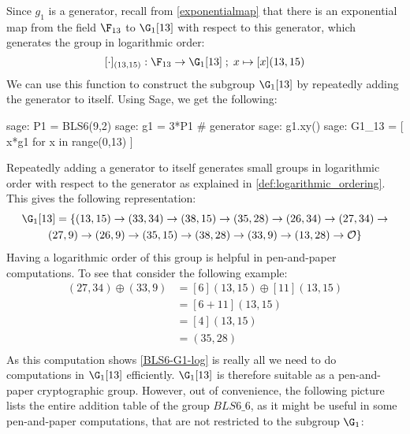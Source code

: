 Since $g_{1}$ is a generator, recall from \ref{exponentialmap} that there is an exponential map from the field $\F_{13}$ to $\G_1[13]$ with respect to this generator, which generates the group in logarithmic order:
$$
[\cdot]_{(13,15)}: \F_{13} \to \G_1[13]\;;\; x \mapsto [x](13,15)
$$ 
We can use this function to construct the subgroup $\G_1[13]$ by repeatedly adding the generator to itself. Using Sage, we get the following:
\begin{sagecommandline}
sage: P1 = BLS6(9,2)
sage: g1 = 3*P1 # generator
sage: g1.xy()
sage: G1_13 = [ x*g1 for x in range(0,13) ]
\end{sagecommandline}
Repeatedly adding a generator to itself generates small groups in logarithmic order with respect to the generator as explained in \ref{def:logarithmic_ordering}. This gives the following representation:
\begin{multline}
\label{BLS6-G1-log}
\G_1[13]=
\{(13,15) \rightarrow (33,34) \rightarrow  (38,15) \rightarrow  (35,28) \rightarrow (26,34) \rightarrow  (27,34) \rightarrow  \\ 
(27,9)  \rightarrow  (26,9) \rightarrow  (35,15) \rightarrow  (38,28) \rightarrow  (33,9) \rightarrow (13,28) \rightarrow  \mathcal{O}\}$$
\end{multline}
Having a logarithmic order of this group is helpful in pen-and-paper computations. To see that consider the following example:
\begin{align*}
(27,34)\oplus (33,9)  & = [6](13,15)\oplus [11](13,15)\\
                      & = [6+11](13,15)\\
                      & = [4](13,15)\\
                      & = (35,28)\\
\end{align*}
As this computation shows \ref{BLS6-G1-log} is really all we need to do computations in $\G_1[13]$ efficiently. $\G_1[13]$ is therefore suitable as a pen-and-paper cryptographic group. However, out of convenience, the following picture lists the entire addition table of the group $BLS6\_6$, as it might be useful in some pen-and-paper computations, that are not restricted to the subgroup $\G_1$:
\begingroup
    \fontsize{7pt}{7pt}\selectfont

